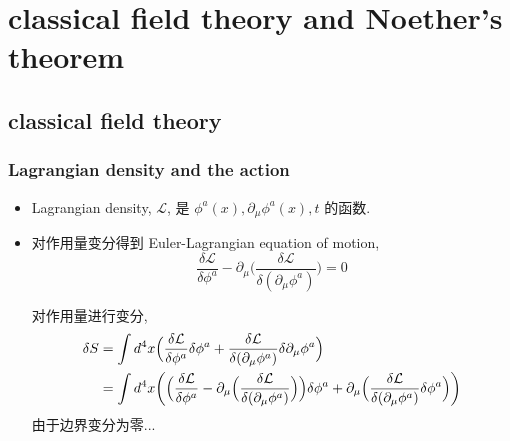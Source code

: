\chapter{classical field theory and Noether's theorem}
\section{classical field theory}
\subsection{Lagrangian density and the action}
\begin{itemize}
	\item Lagrangian density, $\mathcal{L}$, 是 $\phi^a(x), \partial_\mu \phi^a(x), t$ 的函数.
	
	\item 对作用量变分得到 Euler-Lagrangian equation of motion,
	\begin{equation} \label{D.1.1}
		\frac{\delta \mathcal{L}}{\delta \phi^a} - \partial_\mu \Big( \frac{\delta \mathcal{L}}{\delta (\partial_\mu \phi^a)} \Big) = 0
	\end{equation}
	
	\begin{tcolorbox}[title=calculation:]
		对作用量进行变分,
		\begin{align}
			\delta S &= \int d^4 x \Big( \frac{\delta \mathcal{L}}{\delta \phi^a} \delta \phi^a + \frac{\delta \mathcal{L}}{\delta (\partial_\mu \phi^a)} \delta \partial_\mu \phi^a \Big) \notag \\
			&= \int d^4 x \bigg( \Big( \frac{\delta \mathcal{L}}{\delta \phi^a} - \partial_\mu \Big( \frac{\delta \mathcal{L}}{\delta (\partial_\mu \phi^a)} \Big) \Big) \delta \phi^a + \partial_\mu \Big( \frac{\delta \mathcal{L}}{\delta (\partial_\mu \phi^a)} \delta \phi^a \Big) \bigg)
		\end{align}
		由于边界变分为零...
	\end{tcolorbox}
\end{itemize}

